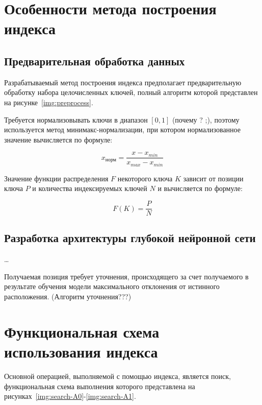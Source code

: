 
\section{Особенности метода построения индекса}

\subsection{Предварительная обработка данных}

Разрабатываемый метод построения индекса предполагает предварительную обработку
набора целочисленных ключей, полный алгоритм которой представлен на
рисунке~\ref{img:preprocess}.


Требуется нормализовывать ключи в диапазон $[0, 1]$ (почему ? ;), поэтому
используется метод минимакс-нормализации, при котором нормализованное значение
вычисляется по формуле:

\begin{equation}
    x_{\text{норм}}= \frac{x - x_{min}}{x_{max} - x_{min}}
\end{equation}

Значение функции распределения $F$ некоторого ключа $K$ зависит от позиции ключа
$P$ и количества индексируемых ключей $N$ и вычисляется по формуле:

\begin{equation}
    F(K) = \frac{P}{N}
\end{equation}

\subsection{Разработка архитектуры глубокой нейронной сети}
…

Получаемая позиция требует уточнения, происходящего за счет получаемого в
результате обучения модели максимального отклонения от истинного расположения.
(Алгоритм уточнения???)

\section{Функциональная схема использования индекса}
Основной операцией, выполняемой с помощью индекса, является поиск,
функциональная схема выполнения которого представлена на
рисунках~\ref{img:search-A0}-\ref{img:search-A1}.

